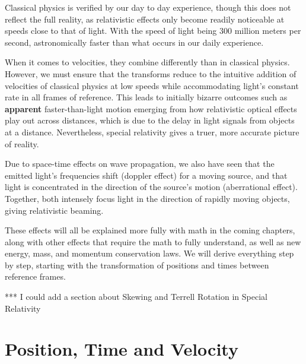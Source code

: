 Classical physics is verified by our day to day experience, though this does not reflect the full reality, as relativistic effects only become readily noticeable at speeds close to that of light.
With the speed of light being 300 million meters per second, astronomically faster than what occurs in our daily experience.

When it comes to velocities, they combine differently than in classical physics.
However, we must ensure that the transforms reduce to the intuitive addition of velocities of classical physics at low speeds while accommodating light's constant rate in all frames of reference.
This leads to initially bizarre outcomes such as \textbf{apparent} faster-than-light motion emerging from how relativistic optical effects play out across distances, which is due to the delay in light signals from objects at a distance.
Nevertheless, special relativity gives a truer, more accurate picture of reality.

Due to space-time effects on wave propagation, we also have seen that the emitted light's frequencies shift (doppler effect) for a moving source, and that light is concentrated in the direction of the source's motion (aberrational effect).
Together, both intensely focus light in the direction of rapidly moving objects, giving relativistic beaming.

These effects will all be explained more fully with math in the coming chapters, along with other effects that require the math to fully understand, as well as new energy, mass, and momentum conservation laws.
We will derive everything step by step, starting with the transformation of positions and times between reference frames.



*** I could add a section about Skewing and Terrell Rotation in Special Relativity

\printbibliography[segment=\therefsegment, heading=subbibliography] %

\chapter{Position, Time and Velocity} \label{ch: Position, Time and Velocity} %

